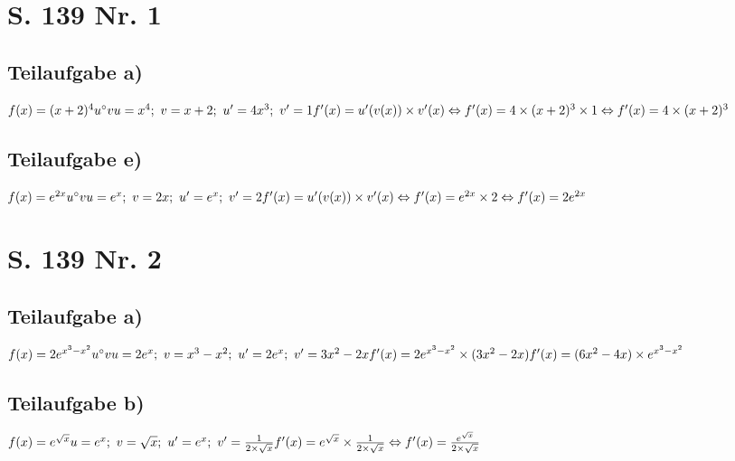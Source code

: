 \documentclass[11pt, a4paper]{report}
\begin{document}
	\chapter{S. 139 Nr. 1}
	\section{Teilaufgabe a)}
	$
	f(x) = (x + 2)^4\\
	u^\circ v\\
	u=x^4;\ v=x + 2;\ u' = 4x^3;\ v' = 1 \\
	f'(x) = u'(v(x)) \times v'(x) \\
	\Leftrightarrow f'(x) = 4 \times (x + 2)^3 \times 1 \\
	\Leftrightarrow f'(x) = 4 \times (x + 2)^3 \\
	$
	\section{Teilaufgabe e)}
	$
	f(x) = e^{2x} \\
	u^\circ v \\
	u = e^x;\ v= 2x;\ u' = e^x;\ v' = 2 \\
	f'(x) = u'(v(x)) \times v'(x) \\
	\Leftrightarrow f'(x) = e^{2x} \times 2 \\
	\Leftrightarrow f'(x) = 2e^{2x}
	$
	\chapter{S. 139 Nr. 2}
	\section{Teilaufgabe a)}
	$
	f(x) = 2e^{x^3-x^2}\\
	u^\circ v\\
	u = 2e^x;\ v= x^3-x^2;\ u' = 2e^x;\ v' = 3x^2-2x \\
	f'(x) = 2e^{x^3-x^2} \times (3x^2-2x)\\
	f'(x) = (6x^2 - 4x) \times e^{x^3 - x^2}
	$
	\section{Teilaufgabe b)}
	$
	f(x) = e^{\sqrt{x}} \\
	u = e^x;\ v = \sqrt{x};\ u' = e^x;\ v' = \frac{1}{2 \times \sqrt{x}} \\
	f'(x) = e^{\sqrt{x}} \times \frac{1}{2 \times \sqrt{x}} \\
	\Leftrightarrow f'(x) = \frac{e^{\sqrt{x}}}{2\times \sqrt{x}}
	$
	
\end{document}
